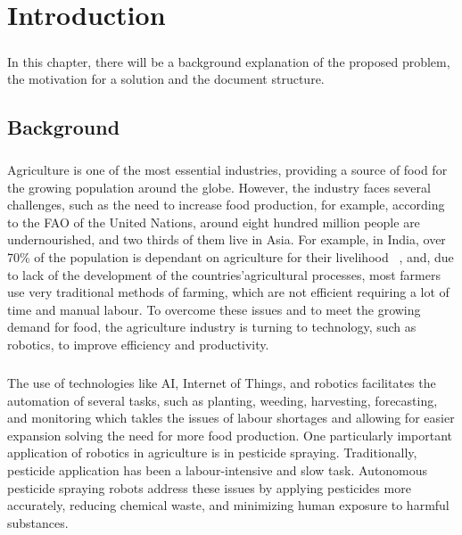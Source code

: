 
%

\chapter{Introduction}
\label{cha:introduction}
\paragraph{}In this chapter, there will be a background explanation of the proposed problem, 
the motivation for a solution and the document structure.

\section{Background}
\label{sec:background} 
\paragraph{}Agriculture is one of the most essential industries, providing a source of food for the growing population 
around the globe. However, the industry faces several challenges, such as the need to increase food production, 
for example, according to the \gls{FAO} of the United Nations, around eight hundred million 
people are undernourished, and two thirds of them live in Asia. For example, in India, over 70\% of the population 
is dependant on agriculture for their livelihood ~\cite{agriIndia}, and, due to lack of the development of 
the countries’agricultural processes, most farmers use very traditional methods of farming, which are not efficient 
requiring a lot of time and manual labour. To overcome these issues and to meet the growing demand for food,
the agriculture industry is turning to technology, such as robotics, to improve efficiency and productivity.
\paragraph{}The use of technologies like AI, Internet of Things, and robotics facilitates the automation of 
several tasks, such as planting, weeding, harvesting, forecasting, and monitoring which takles the issues of 
labour shortages and allowing for easier expansion solving the need for more food production. One particularly important application of robotics in agriculture is in pesticide spraying. 
Traditionally, pesticide application has been a labour-intensive and slow task. Autonomous pesticide 
spraying robots address these issues by applying pesticides more accurately, reducing chemical waste, and 
minimizing human exposure to harmful substances.


